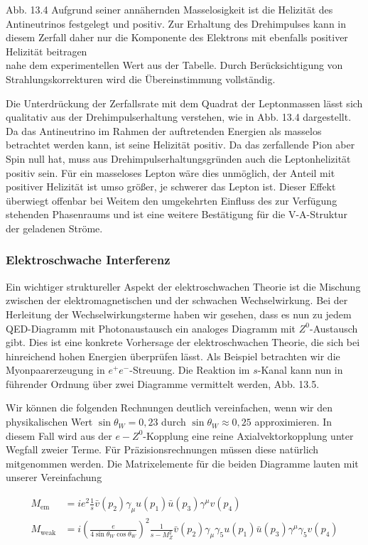 \documentclass[10pt, letterpaper]{article}
\begin{document}
Abb. 13.4 Aufgrund seiner annähernden Masselosigkeit ist die Helizität des Antineutrinos festgelegt und positiv. Zur Erhaltung des Drehimpulses kann in diesem Zerfall daher nur die Komponente des Elektrons mit ebenfalls positiver Helizität beitragen\\
nahe dem experimentellen Wert aus der Tabelle. Durch Berücksichtigung von Strahlungskorrekturen wird die Übereinstimmung vollständig.

Die Unterdrückung der Zerfallsrate mit dem Quadrat der Leptonmassen lässt sich qualitativ aus der Drehimpulserhaltung verstehen, wie in Abb. 13.4 dargestellt. Da das Antineutrino im Rahmen der auftretenden Energien als masselos betrachtet werden kann, ist seine Helizität positiv. Da das zerfallende Pion aber Spin null hat, muss aus Drehimpulserhaltungsgründen auch die Leptonhelizität positiv sein. Für ein masseloses Lepton wäre dies unmöglich, der Anteil mit positiver Helizität ist umso größer, je schwerer das Lepton ist. Dieser Effekt überwiegt offenbar bei Weitem den umgekehrten Einfluss des zur Verfügung stehenden Phasenraums und ist eine weitere Bestätigung für die V-A-Struktur der geladenen Ströme.

\subsubsection*{Elektroschwache Interferenz}
Ein wichtiger struktureller Aspekt der elektroschwachen Theorie ist die Mischung zwischen der elektromagnetischen und der schwachen Wechselwirkung. Bei der Herleitung der Wechselwirkungsterme haben wir gesehen, dass es nun zu jedem QED-Diagramm mit Photonaustausch ein analoges Diagramm mit $Z^{0}$-Austausch gibt. Dies ist eine konkrete Vorhersage der elektroschwachen Theorie, die sich bei hinreichend hohen Energien überprüfen lässt. Als Beispiel betrachten wir die Myonpaarerzeugung in $e^{+} e^{-}$-Streuung. Die Reaktion im $s$-Kanal kann nun in führender Ordnung über zwei Diagramme vermittelt werden, Abb. 13.5.

Wir können die folgenden Rechnungen deutlich vereinfachen, wenn wir den physikalischen Wert $\sin \theta_{W}=0,23$ durch $\sin \theta_{W} \approx 0,25$ approximieren. In diesem Fall wird aus der $e-Z^{0}$-Kopplung eine reine Axialvektorkopplung unter Wegfall zweier Terme. Für Präzisionsrechnungen müssen diese natürlich mitgenommen werden. Die Matrixelemente für die beiden Diagramme lauten mit unserer Vereinfachung

$$
\begin{aligned}
M_{\mathrm{em}} & =i e^{2} \frac{1}{s} \bar{v}\left(p_{2}\right) \gamma_{\mu} u\left(p_{1}\right) \bar{u}\left(p_{3}\right) \gamma^{\mu} v\left(p_{4}\right) \\
M_{\mathrm{weak}} & =i\left(\frac{e}{4 \sin \theta_{W} \cos \theta_{W}}\right)^{2} \frac{1}{s-M_{Z}^{2}} \bar{v}\left(p_{2}\right) \gamma_{\mu} \gamma_{5} u\left(p_{1}\right) \bar{u}\left(p_{3}\right) \gamma^{\mu} \gamma_{5} v\left(p_{4}\right)
\end{aligned}
$$
\end{document}
